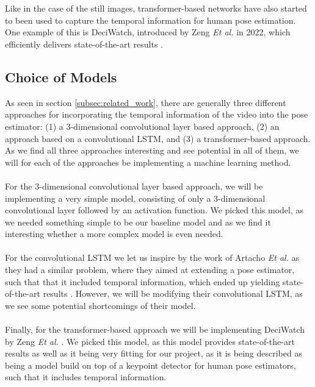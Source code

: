 \documentclass[./main.tex]{subfiles}
\begin{document}
\\
\\
Like in the case of the still images, transformer-based networks have also started to been used to capture the temporal information for human pose estimation. One example of this is DeciWatch, introduced by Zeng \textit{Et al.} in 2022, which efficiently delivers state-of-the-art results \cite{https://doi.org/10.48550/arxiv.2203.08713}.

\subsection{Choice of Models}
\label{sec:model_choice}
As seen in section \ref{subsec:related_work}, there are generally three different approaches for incorporating the temporal information of the video into the pose estimator: (1) a 3-dimensional convolutional layer based approach, (2) an approach based on a convolutional LSTM, and (3) a transformer-based approach. As we find all three approaches interesting and see potential in all of them, we will for each of the approaches be implementing a machine learning method.
\\
\\
For the 3-dimensional convolutional layer based approach, we will be implementing a very simple model, consisting of only a 3-dimensional convolutional layer followed by an activation function. We picked this model, as we needed something simple to be our baseline model and as we find it interesting whether a more complex model is even needed.
\\
\\
For the convolutional LSTM we let us inspire by the work of Artacho \textit{Et al.} as they had a similar problem, where they aimed at extending a pose estimator, such that that it included temporal information, which ended up yielding state-of-the-art results \cite{https://doi.org/10.48550/arxiv.2001.08095}. However, we will be modifying their convolutional LSTM, as we see some potential shortcomings of their model.
\\
\\
Finally, for the transformer-based approach we will be implementing DeciWatch by Zeng \textit{Et al.} \cite{https://doi.org/10.48550/arxiv.2203.08713}. We picked this model, as this model provides state-of-the-art results as well as it being very fitting for our project, as it is being described as being a model build on top of a keypoint detector for human pose estimators, such that it includes temporal information.
\end{document}
